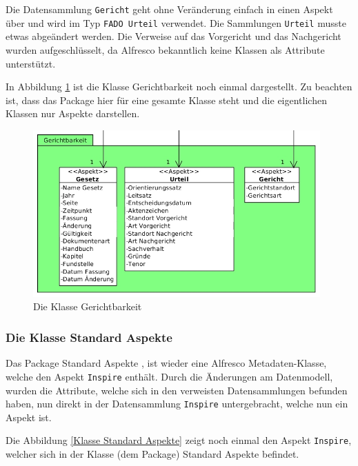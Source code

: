 Die Datensammlung \texttt{Gericht} geht ohne Ver\"anderung einfach in einen Aspekt \"uber und wird im Typ \texttt{FADO Urteil} verwendet. Die Sammlungen \texttt{Urteil} musste etwas abge\"andert werden. Die Verweise auf das Vorgericht und das Nachgericht wurden aufgeschl\"usselt, da Alfresco bekanntlich keine Klassen als Attribute unterst\"utzt.

In Abbildung \ref{Klasse Gerichtbarkeit} ist die Klasse Gerichtbarkeit noch einmal dargestellt. Zu beachten ist, dass das Package hier f\"ur eine gesamte Klasse steht und die eigentlichen Klassen nur Aspekte darstellen.

\begin{figure}[!ht]
\centering
\includegraphics[width=11cm]{Bilder/AlfrescoModell/Gerichtbarkeit.jpg}
\caption{Die Klasse Gerichtbarkeit}
\label{Klasse Gerichtbarkeit}
\centering
\end{figure}

\FloatBarrier
\subsubsection{Die Klasse Standard Aspekte}\label{Die Klasse Standard Aspekte}
Das Package Standard Aspekte , ist wieder eine Alfresco Metadaten-Klasse, welche den Aspekt \texttt{Inspire} enth\"alt. Durch die \"Anderungen am Datenmodell, wurden die Attribute, welche sich in den verweisten Datensammlungen befunden haben, nun direkt in der Datensammlung \texttt{Inspire} untergebracht, welche nun ein Aspekt ist. 

Die Abbildung \ref{Klasse Standard Aspekte} zeigt noch einmal den Aspekt \texttt{Inspire}, welcher sich in der Klasse (dem Package) Standard Aspekte befindet.

